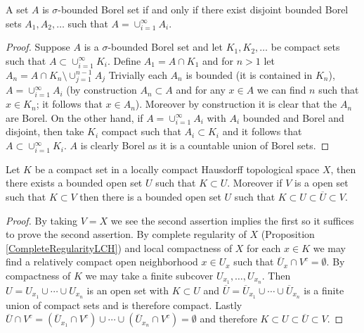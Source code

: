 \begin{prop}\label{SigmaBoundedEquivalence}A set $A$ is $\sigma$-bounded Borel set if and only if
  there exist disjoint bounded Borel sets $A_1, A_2, \dotsc$ such that $A =
  \cup_{i=1}^\infty A_i$.
\end{prop}
\begin{proof}
Suppose $A$ is a $\sigma$-bounded Borel set and let $K_1, K_2, \dotsc$
be compact sets such that $A \subset \cup_{i=1}^\infty K_i$.  Define
$A_1= A \cap K_1$ and for $n>1$ let $A_n = A \cap K_n \setminus
\cup_{j=1}^{n-1} A_j$  Trivially each $A_n$ is bounded (it is contained in
$K_n$), $A = \cup_{i=1}^\infty A_i$ (by construction $A_n \subset A$
and for any $x \in A$ we can find $n$ such that $x \in K_n$; it
follows that $x \in A_n$).  Moreover by construction it is clear that
the $A_n$ are Borel.  On the other hand, if $A =
\cup_{i=1}^\infty A_i$ with $A_i$ bounded and Borel and disjoint, then take $K_i$ compact
such that $A_i \subset K_i$ and it follows that $A \subset
\cup_{i=1}^\infty K_i$.  $A$ is clearly Borel as it is a countable
union of Borel sets.
\end{proof}

\begin{lem}\label{BoundedNeighborhoodsOfCompactSets}Let $K$ be a
  compact set in a locally compact Hausdorff topological
  space $X$, then there exists a bounded open set $U$ such that $K
  \subset U$.  Moreover if $V$ is a open set such that $K \subset V$
  then there is a bounded open set $U$ such that $K \subset U \subset
  \overline{U} \subset V$.
\end{lem}
\begin{proof}
By taking $V = X$ we see the second assertion implies the first so it
suffices to prove the second assertion.  By complete regularity of $X$
(Proposition \ref{CompleteRegularityLCH}) and local compactness of $X$
for each $x \in K$ we may
find a relatively compact open neighborhood $x \in U_x$ such that
$\overline{U}_x \cap V^c = \emptyset$.  By compactness of $K$ we may
take a finite subcover $U_{x_1}, \dotsc, U_{x_n}$.  Then
$U = U_{x_1} \cup \dotsb \cup U_{x_n}$ is an open set with $K \subset
U$ and
$\overline{U} = \overline{U}_{x_1} \cup \dotsb \cup \overline{U}_{x_n}$ is
a finite union of
compact sets and is therefore compact.  Lastly $\overline{U} \cap
V^c = (\overline{U}_{x_1} \cap V^c) \cup \dotsb \cup
(\overline{U}_{x_n} \cap V^c) = \emptyset$ and therefore $K \subset U
\subset \overline{U} \subset V$.
\end{proof}

